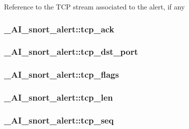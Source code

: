 \label{struct__AI__snort__alert_a09dfe0a841fd3912ec78060d4547cb31}
Reference to the TCP stream associated to the alert, if any \hypertarget{struct__AI__snort__alert_a8aac577224a4325ec50511c6d79b4b79}{
\subsubsection[{tcp\_\-ack}]{ {\bf \_\-AI\_\-snort\_\-alert::tcp\_\-ack}}}
\label{struct__AI__snort__alert_a8aac577224a4325ec50511c6d79b4b79}
\hypertarget{struct__AI__snort__alert_aaca31cb67d48ffc3bfd1227686d5f5a4}{
\subsubsection[{tcp\_\-dst\_\-port}]{ {\bf \_\-AI\_\-snort\_\-alert::tcp\_\-dst\_\-port}}}
\label{struct__AI__snort__alert_aaca31cb67d48ffc3bfd1227686d5f5a4}
\hypertarget{struct__AI__snort__alert_aa643f11db93b70242b57f0a04775e507}{
\subsubsection[{tcp\_\-flags}]{ {\bf \_\-AI\_\-snort\_\-alert::tcp\_\-flags}}}
\label{struct__AI__snort__alert_aa643f11db93b70242b57f0a04775e507}
\hypertarget{struct__AI__snort__alert_ab7e0507050b8e475fea7a4b26c768857}{
\subsubsection[{tcp\_\-len}]{ {\bf \_\-AI\_\-snort\_\-alert::tcp\_\-len}}}
\label{struct__AI__snort__alert_ab7e0507050b8e475fea7a4b26c768857}
\hypertarget{struct__AI__snort__alert_ad6edf59fccea55bf5f940bf36117020b}{
\subsubsection[{tcp\_\-seq}]{ {\bf \_\-AI\_\-snort\_\-alert::tcp\_\-seq}}}
